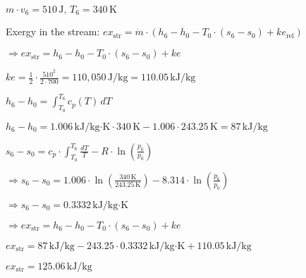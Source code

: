 \( m \cdot v_6 = 510 \, \text{J}, \, T_6 = 340 \, \text{K} \)  

Exergy in the stream:  
\( ex_{\text{str}} = \dot{m} \cdot (h_6 - h_0 - T_0 \cdot (s_6 - s_0) + ke_{\text{rel}}) \)  

\( \Rightarrow ex_{\text{str}} = h_6 - h_0 - T_0 \cdot (s_6 - s_0) + ke \)  

\( ke = \frac{1}{2} \cdot \frac{510^2}{2 \cdot 700} = 110,050 \, \text{J/kg} = 110.05 \, \text{kJ/kg} \)  

\( h_6 - h_0 = \int_{T_0}^{T_6} c_p(T) \, dT \)  

\( h_6 - h_0 = 1.006 \, \text{kJ/kg·K} \cdot 340 \, \text{K} - 1.006 \cdot 243.25 \, \text{K} = 87 \, \text{kJ/kg} \)  

\( s_6 - s_0 = c_p \cdot \int_{T_0}^{T_6} \frac{dT}{T} - R \cdot \ln \left( \frac{p_6}{p_0} \right) \)  

\( \Rightarrow s_6 - s_0 = 1.006 \cdot \ln \left( \frac{340 \, \text{K}}{243.25 \, \text{K}} \right) - 8.314 \cdot \ln \left( \frac{p_6}{p_0} \right) \)  

\( \Rightarrow s_6 - s_0 = 0.3332 \, \text{kJ/kg·K} \)  

\( \Rightarrow ex_{\text{str}} = h_6 - h_0 - T_0 \cdot (s_6 - s_0) + ke \)  

\( ex_{\text{str}} = 87 \, \text{kJ/kg} - 243.25 \cdot 0.3332 \, \text{kJ/kg·K} + 110.05 \, \text{kJ/kg} \)  

\( ex_{\text{str}} = 125.06 \, \text{kJ/kg} \)